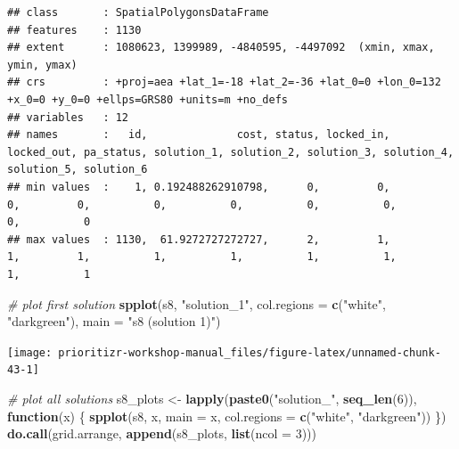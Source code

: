 \documentclass[12pt,]{book}
\newenvironment{Shaded}{\begin{snugshade}}{\end{snugshade}}
\newcommand{\KeywordTok}[1]{\textcolor[rgb]{0.13,0.29,0.53}{\textbf{#1}}}
\newcommand{\DataTypeTok}[1]{\textcolor[rgb]{0.13,0.29,0.53}{#1}}
\newcommand{\DecValTok}[1]{\textcolor[rgb]{0.00,0.00,0.81}{#1}}
\newcommand{\StringTok}[1]{\textcolor[rgb]{0.31,0.60,0.02}{#1}}
\newcommand{\CommentTok}[1]{\textcolor[rgb]{0.56,0.35,0.01}{\textit{#1}}}
\newcommand{\ControlFlowTok}[1]{\textcolor[rgb]{0.13,0.29,0.53}{\textbf{#1}}}
\newcommand{\NormalTok}[1]{#1}
\begin{document}
\begin{verbatim}
## class       : SpatialPolygonsDataFrame 
## features    : 1130 
## extent      : 1080623, 1399989, -4840595, -4497092  (xmin, xmax, ymin, ymax)
## crs         : +proj=aea +lat_1=-18 +lat_2=-36 +lat_0=0 +lon_0=132 +x_0=0 +y_0=0 +ellps=GRS80 +units=m +no_defs 
## variables   : 12
## names       :   id,              cost, status, locked_in, locked_out, pa_status, solution_1, solution_2, solution_3, solution_4, solution_5, solution_6 
## min values  :    1, 0.192488262910798,      0,         0,          0,         0,          0,          0,          0,          0,          0,          0 
## max values  : 1130,  61.9272727272727,      2,         1,          1,         1,          1,          1,          1,          1,          1,          1
\end{verbatim}

\begin{Shaded}
\begin{Highlighting}[]
\CommentTok{# plot first solution}
\KeywordTok{spplot}\NormalTok{(s8, }\StringTok{"solution_1"}\NormalTok{, }\DataTypeTok{col.regions =} \KeywordTok{c}\NormalTok{(}\StringTok{"white"}\NormalTok{, }\StringTok{"darkgreen"}\NormalTok{),}
       \DataTypeTok{main =} \StringTok{"s8 (solution 1)"}\NormalTok{)}
\end{Highlighting}
\end{Shaded}

\begin{center}\texttt{[image: prioritizr-workshop-manual\_files/figure-latex/unnamed-chunk-43-1]} \end{center}

\begin{Shaded}
\begin{Highlighting}[]
\CommentTok{# plot all solutions}
\NormalTok{s8_plots <-}\StringTok{ }\KeywordTok{lapply}\NormalTok{(}\KeywordTok{paste0}\NormalTok{(}\StringTok{"solution_"}\NormalTok{, }\KeywordTok{seq_len}\NormalTok{(}\DecValTok{6}\NormalTok{)), }\ControlFlowTok{function}\NormalTok{(x) \{}
  \KeywordTok{spplot}\NormalTok{(s8, x, }\DataTypeTok{main =}\NormalTok{ x, }\DataTypeTok{col.regions =} \KeywordTok{c}\NormalTok{(}\StringTok{"white"}\NormalTok{, }\StringTok{"darkgreen"}\NormalTok{))}
\NormalTok{\})}
\KeywordTok{do.call}\NormalTok{(grid.arrange, }\KeywordTok{append}\NormalTok{(s8_plots, }\KeywordTok{list}\NormalTok{(}\DataTypeTok{ncol =} \DecValTok{3}\NormalTok{)))}
\end{Highlighting}
\end{Shaded}
\end{document}
